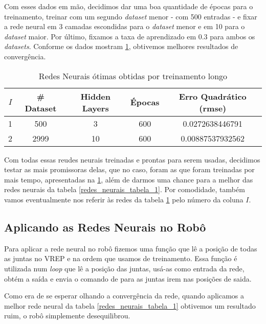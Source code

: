 \documentclass[twoside,conference,a4paper]{IEEEtran}
\begin{document}
Com esses dados em mão, decidimos dar uma boa quantidade de épocas para o treinamento, treinar com um segundo \textsl{dataset} menor  - com 500 entradas - e fixar a rede neural em 3  camadas escondidas para o \textsl{dataset} menor e em 10 para o \textsl{dataset} maior. Por último, fixamos a taxa de aprendizado em $0.3$ para ambos os \textsl{datasets}. Conforme os dados mostram \ref{redes_neurais_tabela_3}, obtivemos melhores resultados de convergência.

 \begin{table}[h]
\caption{Redes Neurais ótimas obtidas por treinamento longo}
 \label{redes_neurais_tabela_3}
 \begin{center}
 \begin{tabular}{|c|c|c|c|c|}
 \hline
 $I$ & \# Dataset & Hidden Layers & Épocas & Erro Quadrático (rmse) \\
 \hline
 1 & 500  & 3 & 600 & 0.0272638446791 \\
 2 & 2999 & 10 & 600 & 0.00887537932562 \\
 \hline
 \end{tabular}
 \end{center}
 \end{table}

Com todas essas reudes neurais treinadas e prontas para serem usadas, decidimos testar as mais promissoras delas, que no caso, foram as que foram treinadas por mais tempo, apresentadas na \ref{redes_neurais_tabela_3}, além de darmos uma chance para a melhor das redes neurais da tabela \ref{redes_neurais_tabela_1}. Por comodidade, também vamos eventualmente nos referir às redes da tabela \ref{redes_neurais_tabela_3} pelo número da coluna $I$.

\subsection{Aplicando as Redes Neurais no Robô}

Para aplicar a rede neural no robô fizemos uma função que lê a posição de todas as juntas no VREP e na ordem que usamos de treinamento. Essa função é utilizada num \textsl{loop} que lê a posição das juntas, usá-as como entrada da rede, obtém a saída e envia o comando de para as juntas irem nas posições de saida.

Como era de se esperar olhando a convergência da rede, quando aplicamos a melhor rede neural  da tabela \ref{redes_neurais_tabela_1} obtivemos um resultado ruim, o robô simplemente desequilibrou.
\end{document}
